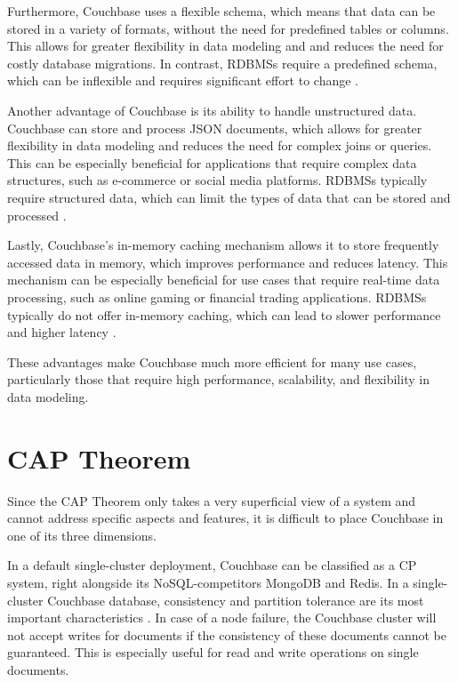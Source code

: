 Furthermore, Couchbase uses a flexible schema, which means that data can be stored in a variety of formats, without the need for predefined tables or columns. This allows for greater flexibility in data modeling and
and reduces the need for costly database migrations. In contrast, \acp{RDBMS} require a predefined
schema, which can be inflexible and requires significant effort to change \parencite{CouchbaseVsRelational} \parencite{ComparingDatabases} \parencite{DifferencesBetweenDatabases}.

Another advantage of Couchbase is its ability to handle unstructured data. Couchbase can store and process \ac{JSON} documents, which allows for greater flexibility in data modeling and reduces the need for complex joins or queries. This can be especially beneficial for applications that require complex data structures, such as e-commerce or social media platforms. \acp{RDBMS} typically require structured data, which can limit the types of data that can be stored and processed \parencite{CouchbaseVsRelational} \parencite{ComparingDatabases} \parencite{DifferencesBetweenDatabases}.

Lastly, Couchbase's in-memory caching mechanism allows it to store frequently accessed data in memory, which improves performance and reduces latency. This mechanism can be especially beneficial for use cases that require real-time data processing, such as online gaming or financial trading applications. \acp{RDBMS} typically do not offer in-memory caching, which can lead to slower performance and higher latency \parencite{CouchbaseVsRelational} \parencite{ComparingDatabases} \parencite{DifferencesBetweenDatabases}.

These advantages make Couchbase much more efficient for many use cases, particularly those that require high performance, scalability, and flexibility in data modeling. 

\section{\ac{CAP} Theorem}

Since the \ac{CAP} Theorem only takes a very superficial view of a system and cannot address specific aspects and features, it is difficult to place Couchbase in one of its three dimensions.

In a default single-cluster deployment, Couchbase can be classified as a \ac{CP} system, right alongside its \ac{NoSQL}-competitors MongoDB and Redis. In a single-cluster Couchbase database, consistency and partition tolerance are its most important characteristics \parencite{Ostrovsky.2015}. In case of a node failure, the Couchbase cluster will not accept writes for documents if the consistency of these documents cannot be guaranteed. This is especially useful for read and write operations on single documents.

